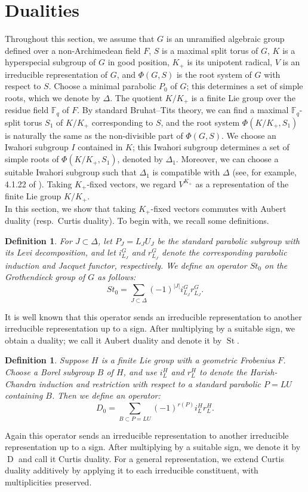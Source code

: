 \documentclass[12pt]{article}
\newtheorem{definition}[theorem]{Definition}
\theoremstyle{remark}
\begin{document}
\section{Dualities}
Throughout this section, we assume that $G$ is an unramified algebraic group defined over a non-Archimedean field $F$, $S$ is a maximal split torus of $G$, $K$ is a hyperspecial subgroup of $G$ in good position, $K_+$ is its unipotent radical, $V$ is an irreducible representation of $G$, and $\Phi(G,S)$ is the root system of $G$ with respect to $S$. Choose a minimal parabolic $P_0$ of $G$; this determines a set of simple roots, which we denote by $\Delta$. The quotient $K/K_+$ is a finite Lie group over the residue field $\mathbb{F}_q$ of $F$. By standard Bruhat--Tits theory, we can find a maximal $\mathbb{F}_q$-split torus $S_1$ of $K/K_+$ corresponding to $S$, and the root system $\Phi(K/K_+,S_1)$ is naturally the same as the non-divisible part of $\Phi(G,S)$. We choose an Iwahori subgroup $I$ contained in $K$; this Iwahori subgroup determines a set of simple roots of $\Phi(K/K_+,S_1)$, denoted by $\Delta_1$. Moreover, we can choose a suitable Iwahori subgroup such that $\Delta_1$ is compatible with $\Delta$ (see, for example, 4.1.22 of \cite{KalethaPrasad2023}). Taking $K_+$-fixed vectors, we regard $V^{K_+}$ as a representation of the finite Lie group $K/K_+$.
\\In this section, we show that taking $K_+$-fixed vectors commutes with Aubert duality (resp.\ Curtis duality).
To begin with, we recall some definitions.
\begin{definition}
For $J \subset \Delta$, let $P_J = L_J U_J$ be the standard parabolic subgroup with its Levi decomposition, and let $i_{L_J}^{G}$ and $r_{L_J}^{G}$ denote the corresponding parabolic induction and Jacquet functor, respectively. We define an operator $St_0$ on the Grothendieck group of $G$ as follows:
$$St_0=\sum_{J \subset \Delta}(-1)^{|J|}i_{L_J}^{G} r_{L_J}^{G}.$$
\end{definition}
It is well known that this operator sends an irreducible representation to another irreducible representation up to a sign. After multiplying by a suitable sign, we obtain a duality; we call it Aubert duality and denote it by $\operatorname{St}$.
\begin{definition}
 Suppose $H$ is a finite Lie group with a geometric Frobenius $F$. Choose a Borel subgroup $B$ of $H$, and use $i_{L}^{H}$ and $r_{L}^{H}$ to denote the Harish-Chandra induction and restriction with respect to a standard parabolic $P=LU$ containing $B$. Then we define an operator:
$$D_0=\sum_{B \subset P=LU}(-1)^{r(P)}i_{L}^{H} r_{L}^{H}.$$
\end{definition}
Again this operator sends an irreducible representation to another irreducible representation up to a sign. After multiplying by a suitable sign, we denote it by $\operatorname{D}$ and call it Curtis duality. For a general representation, we extend Curtis duality additively by applying it to each irreducible constituent, with multiplicities preserved.
\end{document}
